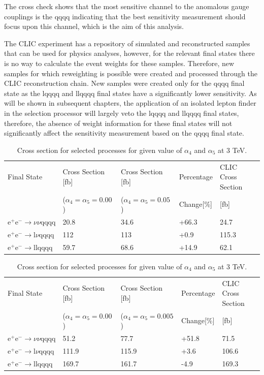 The cross check shows that the most sensitive channel to the anomalous gauge couplings is the \nu{\nu}qqqq indicating that the best sensitivity measurement should focus upon this channel, which is the aim of this analysis.

The CLIC experiment has a repository of simulated and reconstructed samples that can be used for physics analyses, however, for the relevant final states there is no way to calculate the event weights for these samples. Therefore, new samples for which reweighting is possible were created and processed through the CLIC reconstruction chain. New samples were created only for the \nu{\nu}qqqq final state as the l{\nu}qqqq and llqqqq final states have a significantly lower sensitivity. As will be shown in subsequent chapters, the application of an isolated lepton finder in the selection processor will largely veto the l{\nu}qqqq and llqqqq final states, therefore, the absence of weight information for these final states will not significantly affect the sensitivity measurement based on the \nu{\nu}qqqq final state.

\begin{table}[h!]
\centering
\begin{tabular}{ l l l l l}
\hline
Final State & Cross Section [fb] & Cross Section [fb] & Percentage & CLIC Cross Section \\ 
& ($\alpha_{4} = \alpha_{5} = 0.00$) & ($\alpha_{4} = \alpha_{5} = 0.05$) & Change[\%] & [fb] \\ 
\hline
$\text{e}^{+}\text{e}^{-} \rightarrow \nu{\nu}\text{qqqq}$ & 20.8 & 34.6 & +66.3 & 24.7 \\
$\text{e}^{+}\text{e}^{-} \rightarrow \text{l}{\nu}\text{qqqq}$ & 112 & 113 & +0.9 & 115.3 \\
$\text{e}^{+}\text{e}^{-} \rightarrow \text{llqqqq}$ & 59.7 & 68.6 & +14.9 & 62.1 \\
\hline
\end{tabular}
\caption{Cross section for selected processes for given value of $\alpha_{4}$ and $\alpha_{5}$ at 1.4 TeV.}
\label{table:crosssectionsensitivity1400}

\begin{tabular}{ l l l l l}
\hline
Final State & Cross Section [fb] & Cross Section [fb] & Percentage & CLIC Cross Section \\ 
& ($\alpha_{4} = \alpha_{5} = 0.00$) & ($\alpha_{4} = \alpha_{5} = 0.005$) & Change[\%] & [fb] \\ 
\hline
$\text{e}^{+}\text{e}^{-} \rightarrow \nu{\nu}\text{qqqq}$ & 51.2 & 77.7 & +51.8 & 71.5 \\
$\text{e}^{+}\text{e}^{-} \rightarrow \text{l}{\nu}\text{qqqq}$ & 111.9 & 115.9 & +3.6 & 106.6 \\
$\text{e}^{+}\text{e}^{-} \rightarrow \text{llqqqq}$ & 169.7 & 161.7 & -4.9 & 169.3 \\
\hline
\end{tabular}
\caption{Cross section for selected processes for given value of $\alpha_{4}$ and $\alpha_{5}$ at 3 TeV.}
\label{table:crosssectionsensitivity3000}
\end{table}

